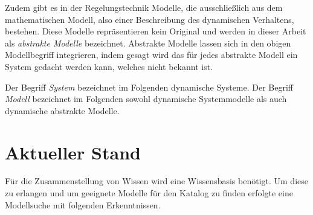 Zudem gibt es in der Regelungstechnik Modelle, die ausschließlich aus dem mathematischen Modell, also einer Beschreibung des dynamischen Verhaltens, bestehen. Diese Modelle repräsentieren kein Original und werden in dieser Arbeit als \textit{abstrakte Modelle} bezeichnet. Abstrakte Modelle lassen sich in den obigen Modellbegriff integrieren, indem gesagt wird das für jedes abstrakte Modell ein System gedacht werden kann, welches nicht bekannt ist. 

Der Begriff \textit{System} bezeichnet im Folgenden dynamische Systeme. Der Begriff \textit{Modell} bezeichnet im Folgenden sowohl dynamische Systemmodelle als auch dynamische abstrakte Modelle.

\section{Aktueller Stand}
\label{Ch:Vorbetrachtung:Sec:CurrentState}
Für die Zusammenstellung von Wissen wird eine Wissensbasis benötigt. Um diese zu erlangen und um geeignete Modelle für den Katalog zu finden erfolgte eine Modellsuche mit folgenden Erkenntnissen.

